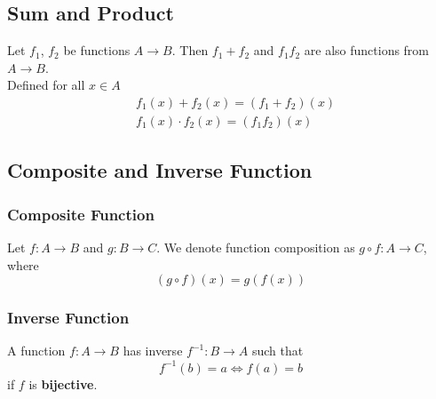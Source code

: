 \documentclass[11pt]{article}
\begin{document}
\subsection{Sum and Product}
Let $f_1$, $f_2$ be functions $A\to B$. Then $f_1 + f_2$ and $f_1f_2$ are also functions from $A \to B$.\\ Defined for all $x\in A$
\begin{align*}
    &f_1(x) + f_2(x) = (f_1 + f_2)(x)\\
    &f_1(x) \cdot f_2(x) = (f_1 f_2)(x)
\end{align*}
\subsection{Composite and Inverse Function}
\subsubsection{Composite Function}
Let $f: A\to B$ and $g: B \to C$. We denote function composition as $g \circ f: A\to C$, where 
\[
    (g\circ f)(x) = g(f(x))
\]
\begin{figure}[H]
    \centering
\end{figure}
\subsubsection{Inverse Function}
A function $f: A \to B$ has inverse $f^{-1}: B \to A$ such that 
\[
    f^{-1}(b) = a \iff f(a) = b
\]
if $f$ is \textbf{bijective}.
\end{document}
